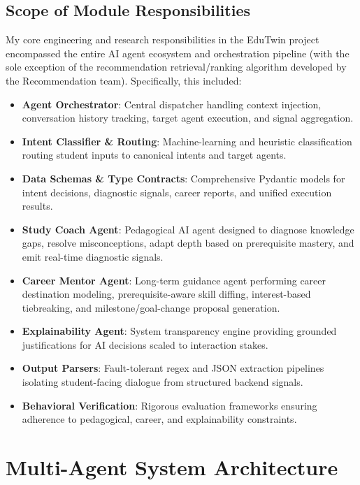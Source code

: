 \documentclass[12pt,a4paper]{article}
\begin{document}
\subsection{Scope of Module Responsibilities}
My core engineering and research responsibilities in the EduTwin project encompassed the entire AI agent ecosystem and orchestration pipeline (with the sole exception of the recommendation retrieval/ranking algorithm developed by the Recommendation team). Specifically, this included:
\begin{itemize}[noitemsep,topsep=2pt]
    \item \textbf{Agent Orchestrator}: Central dispatcher handling context injection, conversation history tracking, target agent execution, and signal aggregation.
    \item \textbf{Intent Classifier \& Routing}: Machine-learning and heuristic classification routing student inputs to canonical intents and target agents.
    \item \textbf{Data Schemas \& Type Contracts}: Comprehensive Pydantic models for intent decisions, diagnostic signals, career reports, and unified execution results.
    \item \textbf{Study Coach Agent}: Pedagogical AI agent designed to diagnose knowledge gaps, resolve misconceptions, adapt depth based on prerequisite mastery, and emit real-time diagnostic signals.
    \item \textbf{Career Mentor Agent}: Long-term guidance agent performing career destination modeling, prerequisite-aware skill diffing, interest-based tiebreaking, and milestone/goal-change proposal generation.
    \item \textbf{Explainability Agent}: System transparency engine providing grounded justifications for AI decisions scaled to interaction stakes.
    \item \textbf{Output Parsers}: Fault-tolerant regex and JSON extraction pipelines isolating student-facing dialogue from structured backend signals.
    \item \textbf{Behavioral Verification}: Rigorous evaluation frameworks ensuring adherence to pedagogical, career, and explainability constraints.
\end{itemize}

\section{Multi-Agent System Architecture}
\label{sec:architecture}
\end{document}
